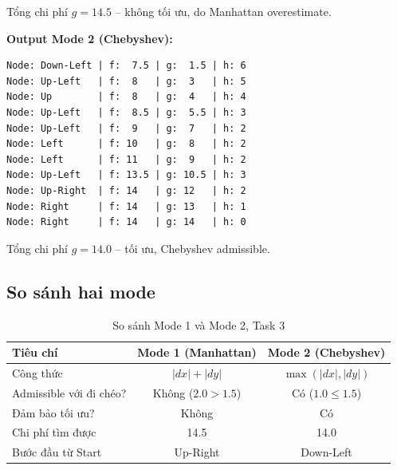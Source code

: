\documentclass[13pt,a4paper]{article}
\begin{document}
Tổng chi phí $g=14.5$ -- không tối ưu, do Manhattan overestimate.

\textbf{Output Mode 2 (Chebyshev):}
\begin{lstlisting}[language={}, numbers=none]
Node: Down-Left | f:  7.5 | g:  1.5 | h: 6
Node: Up-Left   | f:  8   | g:  3   | h: 5
Node: Up        | f:  8   | g:  4   | h: 4
Node: Up-Left   | f:  8.5 | g:  5.5 | h: 3
Node: Up-Left   | f:  9   | g:  7   | h: 2
Node: Left      | f: 10   | g:  8   | h: 2
Node: Left      | f: 11   | g:  9   | h: 2
Node: Up-Left   | f: 13.5 | g: 10.5 | h: 3
Node: Up-Right  | f: 14   | g: 12   | h: 2
Node: Right     | f: 14   | g: 13   | h: 1
Node: Right     | f: 14   | g: 14   | h: 0
\end{lstlisting}

Tổng chi phí $g=14.0$ -- tối ưu, Chebyshev admissible.

\subsection{So sánh hai mode}

\begin{table}[H]
\centering
\begin{tabular}{lcc}
\toprule
\textbf{Tiêu chí} & \textbf{Mode 1 (Manhattan)} & \textbf{Mode 2 (Chebyshev)} \\
\midrule
Công thức & $|dx|+|dy|$ & $\max(|dx|,|dy|)$ \\
Admissible với đi chéo? & Không ($2.0 > 1.5$) & Có ($1.0 \leq 1.5$) \\
Đảm bảo tối ưu? & Không & Có \\
Chi phí tìm được & 14.5 & 14.0 \\
Bước đầu từ Start & Up-Right & Down-Left \\
\bottomrule
\end{tabular}
\caption{So sánh Mode 1 và Mode 2, Task 3}
\end{table}
\end{document}

